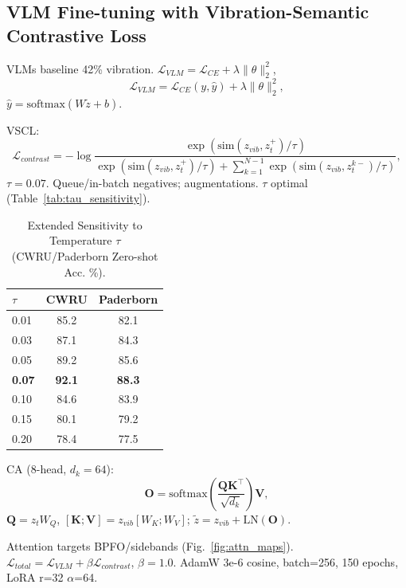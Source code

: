 \begin{table}[htbp]
\subsection{VLM Fine-tuning with Vibration-Semantic Contrastive Loss}
\label{subsec:vlm_fine_tuning}

VLMs baseline 42\% vibration. $\mathcal{L}_{VLM} = \mathcal{L}_{CE} + \lambda \|\theta\|_2^2$,
\begin{equation}
\mathcal{L}_{VLM} = \mathcal{L}_{CE}(y, \hat{y}) + \lambda \|\theta\|_2^2,
\label{eq:f3}
\end{equation}
$\hat{y}=\mathrm{softmax}(W \tilde{z} + b)$.

VSCL:
\begin{equation}
\mathcal{L}_{contrast} = -\log \frac{\exp(\mathrm{sim}(z_{vib}, z_t^+)/\tau)}{\exp(\mathrm{sim}(z_{vib}, z_t^+)/\tau) + \sum_{k=1}^{N-1} \exp(\mathrm{sim}(z_{vib}, z_t^{k-})/\tau)},
\label{eq:f4}
\end{equation}
$\tau=0.07$. Queue/in-batch negatives; augmentations. $\tau$ optimal (Table~\ref{tab:tau_sensitivity}).

\begin{table}[htbp]
\centering
\caption{Extended Sensitivity to Temperature $\tau$ (CWRU/Paderborn Zero-shot Acc. \%).}
\label{tab:tau_extended}
\begin{tabular}{@{}lcc@{}}
\toprule
$\tau$ & CWRU & Paderborn \\
\midrule
0.01 & 85.2 & 82.1 \\
0.03 & 87.1 & 84.3 \\
0.05 & 89.2 & 85.6 \\
\textbf{0.07} & \textbf{92.1} & \textbf{88.3} \\
0.10 & 84.6 & 83.9 \\
0.15 & 80.1 & 79.2 \\
0.20 & 78.4 & 77.5 \\
\bottomrule
\end{tabular}
\end{table}

CA (8-head, $d_k=64$):
\begin{equation}
\mathbf{O} = \mathrm{softmax}\left( \frac{\mathbf{Q} \mathbf{K}^\top}{\sqrt{d_k}} \right) \mathbf{V},
\label{eq:f5}
\end{equation}
$\mathbf{Q}=z_t W_Q$, $[\mathbf{K};\mathbf{V}]=z_{vib}[W_K;W_V]$; $\tilde{z}=z_{vib} + \mathrm{LN}(\mathbf{O})$.

Attention targets BPFO/sidebands (Fig.~\ref{fig:attn_maps}). $\mathcal{L}_{total}=\mathcal{L}_{VLM} + \beta \mathcal{L}_{contrast}$, $\beta=1.0$. AdamW 3e-6 cosine, batch=256, 150 epochs, LoRA r=32 $\alpha$=64.


\end{table}
